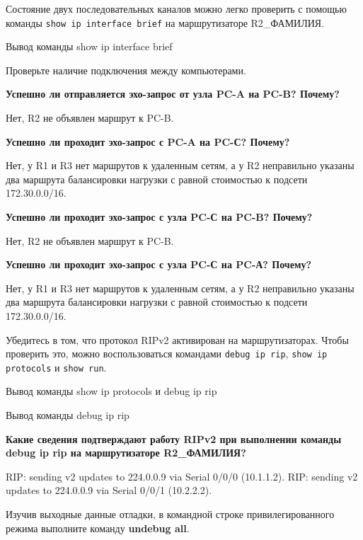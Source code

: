 Состояние двух последовательных каналов можно легко проверить
с помощью команды \texttt{show ip interface brief}
на маршрутизаторе R2\_ФАМИЛИЯ.

\begin{image}
	\caption{Вывод команды show ip interface brief}
\end{image}

Проверьте наличие подключения между компьютерами.

\textbf{Успешно ли отправляется эхо-запрос от узла PC-A на PC-B? Почему?}

Нет, R2 не объявлен маршрут к PC-B.

\textbf{Успешно ли проходит эхо-запрос с PC-A на PC-С? Почему?}

Нет, у R1 и R3 нет маршрутов к удаленным сетям,
а у R2 неправильно указаны два маршрута балансировки нагрузки
с равной стоимостью к подсети 172.30.0.0/16.

\textbf{Успешно ли проходит эхо-запрос с узла PC-С на PC-B? Почему?}

Нет, R2 не объявлен маршрут к PC-B.

\textbf{Успешно ли проходит эхо-запрос с узла PC-С на PC-А? Почему?}

Нет, у R1 и R3 нет маршрутов к удаленным сетям,
а у R2 неправильно указаны два маршрута балансировки нагрузки
с равной стоимостью к подсети 172.30.0.0/16.

Убедитесь в том, что протокол RIPv2 активирован на маршрутизаторах.
Чтобы проверить это, можно воспользоваться командами \texttt{debug ip rip},
\texttt{show ip protocols} и \texttt{show run}.

\begin{image}
	\caption{Вывод команды show ip protocols и debug ip rip}
\end{image}

\begin{image}
	\caption{Вывод команды debug ip rip}
\end{image}

\textbf{Какие сведения подтверждают работу RIPv2
	при выполнении команды debug ip rip на маршрутизаторе R2\_ФАМИЛИЯ?}

RIP: sending v2 updates to 224.0.0.9 via Serial 0/0/0 (10.1.1.2).
RIP: sending v2 updates to 224.0.0.9 via Serial 0/0/1 (10.2.2.2).

Изучив выходные данные отладки, в командной строке привилегированного
режима выполните команду \textbf{undebug all}.

